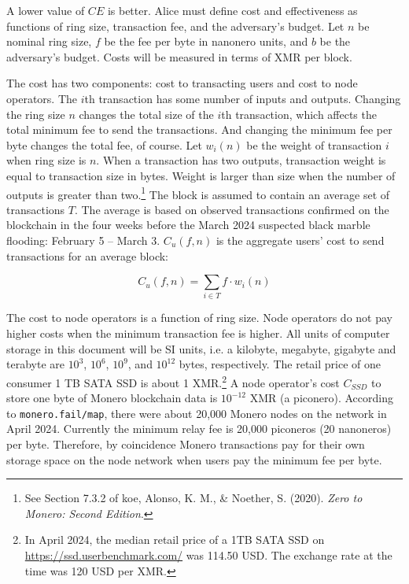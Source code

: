 \documentclass[english]{article}
\begin{document}
A lower value of $CE$ is better. Alice must define cost and effectiveness
as functions of ring size, transaction fee, and the adversary's budget.
Let $n$ be nominal ring size, $f$ be the fee per byte in nanonero
units, and $b$ be the adversary's budget. Costs will be measured
in terms of XMR per block.

The cost has two components: cost to transacting users and cost to
node operators. The $i$th transaction has some number of inputs and
outputs. Changing the ring size $n$ changes the total size of the
$i$th transaction, which affects the total minimum fee to send the
transactions. And changing the minimum fee per byte changes the total
fee, of course. Let $w_{i}\left(n\right)$ be the weight of transaction
$i$ when ring size is $n$. When a transaction has two outputs, transaction
weight is equal to transaction size in bytes. Weight is larger than
size when the number of outputs is greater than two.\footnote{See Section 7.3.2 of koe, Alonso, K. M., \& Noether, S. (2020). \textit{Zero
to Monero: Second Edition}.} The block is assumed to contain an average set of transactions $T$.
The average is based on observed transactions confirmed on the blockchain
in the four weeks before the March 2024 suspected black marble flooding:
February 5 -- March 3. $C_{u}\left(f,n\right)$ is the aggregate
users' cost to send transactions for an average block:

\begin{equation}
C_{u}\left(f,n\right)=\underset{i\in T}{\sum}f\cdot w_{i}\left(n\right)
\end{equation}

The cost to node operators is a function of ring size. Node operators
do not pay higher costs when the minimum transaction fee is higher.
All units of computer storage in this document will be SI units, i.e.
a kilobyte, megabyte, gigabyte and terabyte are $10^{3}$, $10^{6}$,
$10^{9}$, and $10^{12}$ bytes, respectively. The retail price of
one consumer 1 TB SATA SSD is about 1 XMR.\footnote{In April 2024, the median retail price of a 1TB SATA SSD on \url{https://ssd.userbenchmark.com/}
was 114.50 USD. The exchange rate at the time was 120 USD per XMR.} A node operator's cost $C_{SSD}$ to store one byte of Monero blockchain
data is $10^{-12}$ XMR (a piconero). According to \texttt{monero.fail/map},
there were about 20,000 Monero nodes on the network in April 2024.
Currently the minimum relay fee is 20,000 piconeros (20 nanoneros)
per byte. Therefore, by coincidence Monero transactions pay for their
own storage space on the node network when users pay the minimum fee
per byte.
\end{document}
